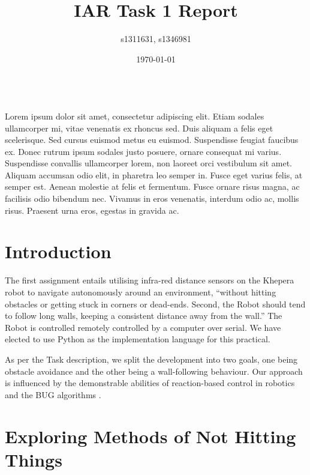 \documentclass[11pt, a4paper]{article}
\renewenvironment{abstract}{%
{\mdseries\scshape\Large\abstractname}
\vspace{1em}\\
}{\par\noindent}
\begin{document}
\title{IAR Task 1 Report}
\author{s1311631, s1346981}
\date{\today}
\maketitle



\begin{abstract}
  Lorem ipsum dolor sit amet, consectetur adipiscing elit. Etiam sodales ullamcorper mi, vitae venenatis ex rhoncus sed. Duis aliquam a felis eget scelerisque. Sed cursus euismod metus eu euismod. Suspendisse feugiat faucibus ex. Donec rutrum ipsum sodales justo posuere, ornare consequat mi varius. Suspendisse convallis ullamcorper lorem, non laoreet orci vestibulum sit amet. Aliquam accumsan odio elit, in pharetra leo semper in. Fusce eget varius felis, at semper est. Aenean molestie at felis et fermentum. Fusce ornare risus magna, ac facilisis odio bibendum nec. Vivamus in eros venenatis, interdum odio ac, mollis risus. Praesent urna eros, egestas in gravida ac.
\end{abstract}



\section{Introduction}

The first assignment entails utilising infra-red distance sensors on the Khepera 
robot to navigate autonomously around an environment, ``without hitting obstacles 
or getting stuck in corners or dead-ends. Second, the Robot should tend to follow long walls, 
keeping a consistent distance away from the wall.'' The Robot is controlled remotely 
controlled by a computer over serial. We have elected to use Python as the 
implementation language for this practical.

As per the Task description, we split the development into two goals, one being obstacle 
avoidance and the other being a wall-following behaviour. Our approach is influenced 
by the demonstrable abilities of reaction-based control in robotics and the BUG 
algorithms \cite{principlesrobot}.



\section{Exploring Methods of Not Hitting Things}
\end{document}
